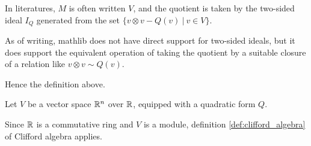 \begin{remark}
  \label{mk:two_sided_ideals}
  
  In literatures, $M$ is often written $V$, and the quotient is taken by the two-sided ideal $I_Q$ generated from the set
  $\{ v \otimes v - Q(v) \:\vert\: v \in V \}$.

  As of writing, mathlib does not have direct support for two-sided ideals,
  but it does support the equivalent operation of taking the quotient by a suitable closure of
  a relation like $v \otimes v \sim Q(v)$.

  Hence the definition above.

\end{remark}

\begin{example}
  \label{ex:clifford_algebra_v}

  Let $V$ be a vector space $\mathbb R^n$ over $\mathbb R$, equipped with a quadratic form $Q$.
  
  Since $\mathbb R$ is a commutative ring and $V$ is a module,
  definition \ref{def:clifford_algebra} of Clifford algebra applies.
\end{example}
